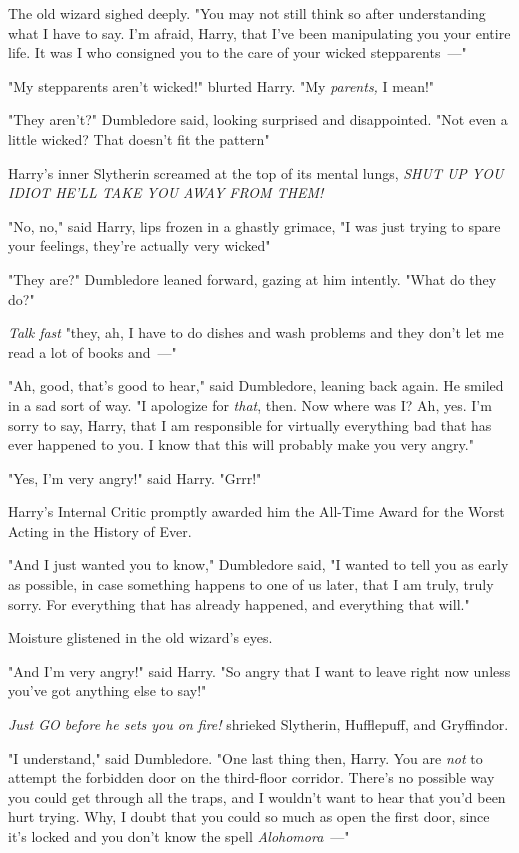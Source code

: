 The old wizard sighed deeply. "You may not still think so after understanding
what I have to say. I'm afraid, Harry, that I've been manipulating you your
entire life. It was I who consigned you to the care of your wicked
stepparents~---"

"My stepparents aren't wicked!" blurted Harry. "My \emph{parents,} I mean!"

"They aren't?" Dumbledore said, looking surprised and disappointed. "Not even a
little wicked? That doesn't fit the pattern{\el}"

Harry's inner Slytherin screamed at the top of its mental lungs, \emph{SHUT UP
YOU IDIOT HE'LL TAKE YOU AWAY FROM THEM!}

"No, no," said Harry, lips frozen in a ghastly grimace, "I was just trying to
spare your feelings, they're actually very wicked{\el}"

"They are?" Dumbledore leaned forward, gazing at him intently. "What do they
do?"

\emph{Talk fast} "they, ah, I have to do dishes and wash problems and they
don't let me read a lot of books and~---"

"Ah, good, that's good to hear," said Dumbledore, leaning back again. He smiled
in a sad sort of way. "I apologize for \emph{that}, then. Now where was I? Ah,
yes. I'm sorry to say, Harry, that I am responsible for virtually everything
bad that has ever happened to you. I know that this will probably make you very
angry."

"Yes, I'm very angry!" said Harry. "Grrr!"

Harry's Internal Critic promptly awarded him the All-Time Award for the Worst
Acting in the History of Ever.

"And I just wanted you to know," Dumbledore said, "I wanted to tell you as
early as possible, in case something happens to one of us later, that I am
truly, truly sorry. For everything that has already happened, and everything
that will."

Moisture glistened in the old wizard's eyes.

"And I'm very angry!" said Harry. "So angry that I want to leave right now
unless you've got anything else to say!"

\emph{Just GO before he sets you on fire!} shrieked Slytherin, Hufflepuff, and
Gryffindor.

"I understand," said Dumbledore. "One last thing then, Harry. You are
\emph{not} to attempt the forbidden door on the third-floor corridor. There's
no possible way you could get through all the traps, and I wouldn't want to
hear that you'd been hurt trying. Why, I doubt that you could so much as open
the first door, since it's locked and you don't know the spell
\emph{Alohomora}~---"

